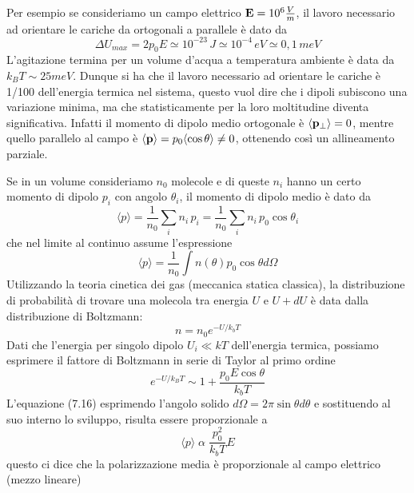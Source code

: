 Per esempio se consideriamo un campo elettrico $\bold{E}  = 10^6 \frac{V}{m}$, il lavoro necessario ad orientare le cariche da ortogonali a parallele \`e dato da 
\begin{equation*}
	\Delta U_{max} = 2p_0 E \simeq 10^{-23} \,J \simeq 10^{-4} \,eV \simeq 0,1\, meV
\end{equation*}
L'agitazione termina per un volume d'acqua a temperatura ambiente \`e data da $k_B T \sim 25 meV$. Dunque si ha che il lavoro necessario ad orientare le cariche \`e 1/100 dell'energia termica nel sistema, questo vuol dire che i dipoli subiscono una variazione minima, ma che statisticamente per la loro moltitudine diventa significativa. Infatti il momento di dipolo medio ortogonale \`e $\langle \bold{p}_{\bot} \rangle = 0 $, mentre quello parallelo al campo \`e $\langle \bold{p} \rangle = p_0 \langle \cos \theta \rangle \neq 0$, ottenendo cos\`i un allineamento parziale.

Se in un volume consideriamo $n_0$ molecole e di queste $n_i$ hanno un certo momento di dipolo $p_i$ con angolo $\theta_i$, il momento di dipolo medio \`e dato da 
\begin{equation*}
	\langle p \rangle = \frac{1}{n_0} \sum_i n_i\,p_i = \frac{1}{n_0} \sum_i n_i \,p_0\cos\theta_i
\end{equation*} 
che nel limite al continuo assume l'espressione
\begin{equation}
	\langle p \rangle = \frac{1}{n_0} \int n(\theta) p_0 \cos \theta d \Omega 
\end{equation}
Utilizzando la teoria cinetica dei gas (meccanica statica classica), la distribuzione di probabilit\`a di trovare una molecola tra energia $U$ e $U+dU$ \`e data dalla distribuzione di Boltzmann:
\begin{equation*}
	n = n_0 e^{-U/k_bT}
\end{equation*}
Dati che l'energia per singolo dipolo $U_i \ll kT$ dell'energia termica, possiamo esprimere il fattore di
Boltzmann in serie di Taylor al primo ordine 
\begin{equation*}
	e^{-U/k_B T} \sim 1 + \frac{p_0 E \cos\theta}{k_b T}
\end{equation*}
L'equazione (7.16) esprimendo l'angolo solido $d \Omega = 2 \pi \sin\theta d\theta$ e sostituendo al suo interno lo sviluppo, risulta essere proporzionale a 
\begin{equation*}
	\langle p \rangle \;\alpha \; \frac{p_0^2}{k_b T} E
\end{equation*}
questo ci dice che la polarizzazione media \`e proporzionale al campo elettrico (mezzo lineare)

